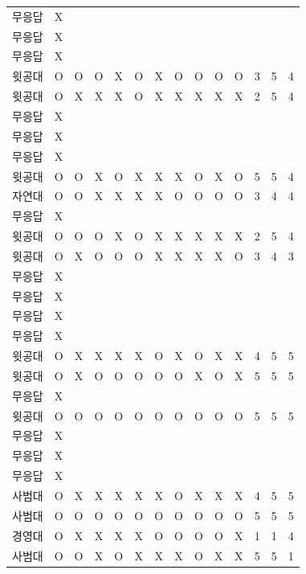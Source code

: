 \documentclass[11pt,a4paper]{article}
\begin{document}
\begin{center}
\begin{tabular}{ | p{2cm} | c | c | c | c | c | c | c | c | c | c | c | c | c | }
무응답 & X & & & & & & & & & & & & \\
무응답 & X & & & & & & & & & & & & \\
무응답 & X & & & & & & & & & & & & \\
윗공대 & O & O & O & X & O & X & O & O & O & O & 3 & 5 & 4 \\
윗공대 & O & X & X & X & O & X & X & X & X & X & 2 & 5 & 4 \\
무응답 & X & & & & & & & & & & & & \\
무응답 & X & & & & & & & & & & & & \\
무응답 & X & & & & & & & & & & & & \\
윗공대 & O & O & X & O & X & X & X & O & X & O & 5 & 5 & 4 \\
자연대 & O & O & X & X & X & X & O & O & O & O & 3 & 4 & 4 \\
무응답 & X & & & & & & & & & & & & \\
윗공대 & O & O & O & X & O & X & X & X & X & X & 2 & 5 & 4 \\
윗공대 & O & X & O & O & O & X & X & X & X & O & 3 & 4 & 3 \\
무응답 & X & & & & & & & & & & & & \\
무응답 & X & & & & & & & & & & & & \\
무응답 & X & & & & & & & & & & & & \\
무응답 & X & & & & & & & & & & & & \\
윗공대 & O & X & X & X & X & O & X & O & X & X & 4 & 5 & 5 \\
윗공대 & O & X & O & O & O & O & O & X & O & X & 5 & 5 & 5 \\
무응답 & X & & & & & & & & & & & & \\
윗공대 & O & O & O & O & O & O & O & O & O & O & 5 & 5 & 5 \\
무응답 & X & & & & & & & & & & & & \\
무응답 & X & & & & & & & & & & & & \\
무응답 & X & & & & & & & & & & & & \\
사범대 & O & X & X & X & X & X & O & X & X & X & 4 & 5 & 5 \\
사범대 & O & O & O & O & O & O & O & O & O & O & 5 & 5 & 5 \\
경영대 & O & X & X & X & X & O & O & O & O & X & 1 & 1 & 4 \\
사범대 & O & O & X & O & X & X & X & O & X & X & 5 & 5 & 1 \\
\hline
\end{tabular}
\end{center}
\end{document}
